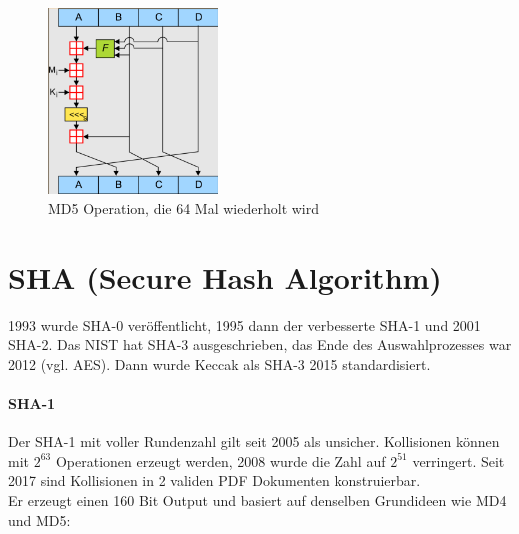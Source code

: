 \begin{figure}[h]
    \includegraphics[width=0.4\textwidth]{figures/fig9-md5}
    \centering
    \caption{MD5 Operation, die 64 Mal wiederholt wird}
\end{figure}


\section{SHA (Secure Hash Algorithm)}

1993 wurde SHA-0 veröffentlicht, 1995 dann der verbesserte SHA-1 und 2001 SHA-2. Das NIST hat SHA-3 ausgeschrieben, das Ende des Auswahlprozesses war 2012 (vgl. AES).
Dann wurde Keccak als SHA-3 2015 standardisiert. \\

\paragraph{SHA-1}
Der SHA-1 mit voller Rundenzahl gilt seit 2005 als unsicher. Kollisionen können mit $2^{63}$ Operationen erzeugt werden, 2008 wurde die Zahl auf $2^{51}$ verringert.
Seit 2017 sind Kollisionen in 2 validen PDF Dokumenten konstruierbar. \\

Er erzeugt einen 160 Bit Output und basiert auf denselben Grundideen wie MD4 und MD5:

